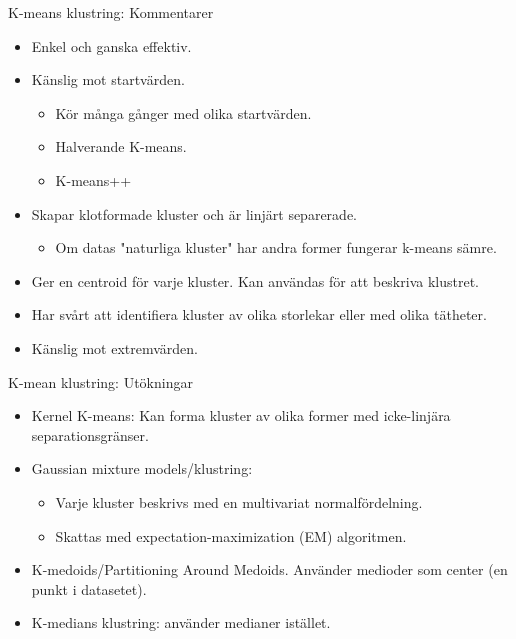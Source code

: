 \documentclass[10pt,english]{beamer}
\begin{document}
\begin{frame}{K-means klustring: Kommentarer}

    \begin{itemize}
        \item Enkel och ganska effektiv.
        \item Känslig mot startvärden.
        \begin{itemize}
            \item Kör många gånger med olika startvärden.
            \item Halverande K-means.
            \item K-means++
        \end{itemize}
        \item Skapar klotformade kluster och är linjärt separerade.
        \begin{itemize}
            \item Om datas "naturliga kluster" har andra former fungerar k-means sämre.
        \end{itemize}
        \item Ger en centroid för varje kluster. Kan användas för att beskriva klustret.
        \item Har svårt att identifiera kluster av olika storlekar eller med olika tätheter.
        \item Känslig mot extremvärden.
    \end{itemize}
    
\end{frame}

\begin{frame}{K-mean klustring: Utökningar}

    \begin{itemize}
        \item Kernel K-means: Kan forma kluster av olika former med icke-linjära separationsgränser.
        \item Gaussian mixture models/klustring:
        \begin{itemize}
            \item Varje kluster beskrivs med en multivariat normalfördelning.
            \item Skattas med expectation-maximization (EM) algoritmen.
        \end{itemize}
        \item K-medoids/Partitioning Around Medoids. Använder medioder som center (en punkt i datasetet).
        \item K-medians klustring: använder medianer istället.
    \end{itemize}
    
\end{frame}
\end{document}
